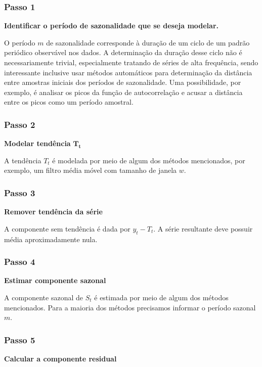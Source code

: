 \subsubsection{Passo 1}

\textbf{Identificar o período de sazonalidade que se deseja modelar.}

O período $m$ de sazonalidade corresponde à duração de um ciclo de um padrão
periódico observável nos dados. A determinação da duração desse ciclo não é
necessariamente trivial, especialmente tratando de séries de alta frequência,
sendo interessante inclusive usar métodos automáticos para determinação da
distância entre amostras iniciais dos períodos de sazonalidade. Uma
possibilidade, por exemplo,  é analisar os picos da função de autocorrelação e
acusar a distância entre os picos como um período amostral.

\subsubsection{Passo 2}

\textbf{Modelar tendência }$\mathbf{T_t}$

A tendência $T_t$ é modelada por meio de algum dos métodos mencionados, por
exemplo, um filtro média móvel com tamanho de janela $w$.

\subsubsection{Passo 3}

\textbf{Remover tendência da série}

A componente sem tendência é dada por $y_t - T_t$. A série resultante deve
possuir média aproximadamente nula.

\subsubsection{Passo 4}

\textbf{Estimar componente sazonal}

A componente sazonal de $S_t$ é estimada por meio de algum dos métodos
mencionados. Para a maioria dos métodos precisamos informar o período sazonal
$m$.

\subsubsection{Passo 5}

\textbf{Calcular a componente residual}

